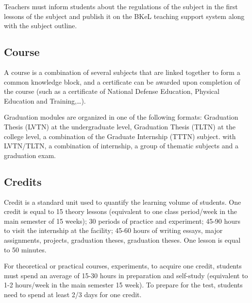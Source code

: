 Teachers must inform students about the regulations of the subject in the first lessons of the subject and publish it on the BKeL teaching support system along with the subject outline.

\subsection{Course}
A course is a combination of several subjects that are linked together to form a common knowledge block, and a certificate can be awarded upon completion of the course (such as a certificate of National Defense Education, Physical Education and Training,…).

Graduation modules are organized in one of the following formats: Graduation Thesis (LVTN) at the undergraduate level, Graduation Thesis (TLTN) at the college level, a combination of the Graduate Internship (TTTN) subject. with LVTN/TLTN, a combination of internship, a group of thematic subjects and a graduation exam.

\subsection{Credits}
Credit is a standard unit used to quantify the learning volume of students. One credit is equal to 15 theory lessons (equivalent to one class period/week in the main semester of 15 weeks); 30 periods of practice and experiment; 45-90 hours to visit the internship at the facility; 45-60 hours of writing essays, major assignments, projects, graduation theses, graduation theses. One lesson is equal to 50 minutes.

For theoretical or practical courses, experiments, to acquire one credit, students must spend an average of 15-30 hours in preparation and self-study (equivalent to 1-2 hours/week in the main semester 15 week). To prepare for the test, students need to spend at least 2/3 days for one credit.